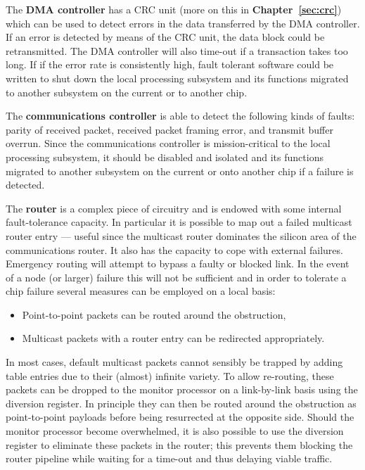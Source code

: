 \documentclass[oneside, a4paper, 11pt]{memoir}
\newenvironment{itmz}{
	\begin{itemize}
		\setlength{\itemsep}{0pt}
		\setlength{\parskip}{0pt}
	}{\end{itemize}}
\newlength\drop
\begin{document}
The \textbf{DMA controller} has a CRC unit (more on this in \textbf{Chapter~\ref{sec:crc}}) which can be used to detect errors in the data transferred by the DMA controller. If an error is detected by means of the CRC unit, the data block could be retransmitted. The DMA controller will also time-out if a transaction takes too long. If if the error rate is consistently high, fault tolerant software could be written to shut down the local processing subsystem and its functions migrated to another subsystem on the current or to another chip.

The \textbf{communications controller} is able to detect the following kinds of faults:
parity of received packet, received packet framing error, and transmit buffer overrun. Since the communications controller is mission-critical to the local processing subsystem, it should be disabled and isolated and its functions migrated to another subsystem on the current or onto another chip if a failure is detected.

The \textbf{router} is a complex piece of circuitry and is endowed with some internal fault-tolerance capacity. In particular it is possible to map out a failed multicast router entry --- useful since the multicast router dominates the silicon area of the communications router. It also has the capacity to cope with external failures. Emergency routing will attempt to bypass a faulty or blocked link. In the event of a node (or larger) failure this will not be sufficient and in order to tolerate a chip failure several measures can be employed on a local basis:
\begin{itmz}
	\item Point-to-point packets can be routed around the obstruction,
	\item Multicast packets with a router entry can be redirected appropriately.
\end{itmz}
In most cases, default multicast packets cannot sensibly be trapped by adding table entries due to their (almost) infinite variety. To allow re-routing, these packets can be dropped to the monitor processor on a link-by-link basis using the diversion register. In principle they can then be routed around the obstruction as point-to-point payloads before being resurrected at the opposite side. Should the monitor processor become overwhelmed, it is also possible to use the diversion register to eliminate these packets in the router; this prevents them blocking the router pipeline while waiting for a time-out and thus delaying viable traffic.
\end{document}
